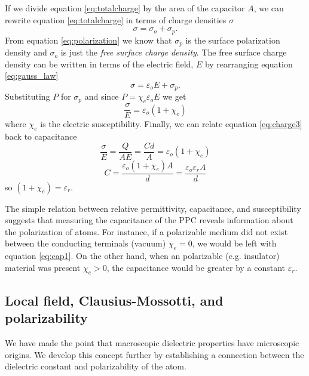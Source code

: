 If we divide equation \ref{eq:totalcharge} by the area of the capacitor $A$, we can rewrite equation \ref{eq:totalcharge} in terms of charge densities $\sigma$
\begin{equation}\label{eq:charged}
\sigma = \sigma_{o}+\sigma_{p}.
\end{equation}
From equation \ref{eq:polarization} we know that $\sigma_{p}$ is the surface polarization density and $\sigma_{o}$ is just the \textit{free surface charge density}. The free surface charge density can be written in terms of the electric field, $E$ by rearranging equation \ref{eq:gauss_law}
\begin{equation}\label{eq:charge2}
\sigma = \varepsilon_{o}E + \sigma_{p}.
\end{equation}
Substituting $P$ for $\sigma_{p}$ and since $P = \chi_{e}\varepsilon_{o}E$ we get 
\begin{equation}\label{eq:charge3}
\frac{\sigma}{E } = \varepsilon_{o}(1+\chi_{e})
\end{equation}
where $\chi_{e}$ is the electric susceptibility. Finally, we can relate equation \ref{eq:charge3} back to capacitance 
\begin{equation}\label{eq:charge4}
\frac{\sigma}{E } = \frac{Q}{AE} = \frac{Cd}{A} = \varepsilon_{o}(1+\chi_{e})
\end{equation}
\begin{equation}\label{eq:charge5}
C = \frac{\varepsilon_{o}(1+\chi_{e})A}{d} =  \frac{\varepsilon_{o} \varepsilon_{r} A}{d} 
\end{equation}
so $(1+\chi_{e})= \varepsilon_{r}$.

The simple relation between relative permittivity, capacitance, and susceptibility suggests that measuring the capacitance of the PPC reveals information about the polarization of atoms. For instance, if a polarizable medium did not exist between the conducting terminals (vacuum) $\chi_{e} =  0$, we would be left with equation \ref{eq:cap1}. On the other hand, when an polarizable (e.g. insulator) material was present $\chi_{e} > 0$, the capacitance would be greater by a constant $\varepsilon_{r}$.

\subsection{Local field, Clausius-Mossotti, and polarizability}

We have made the point that macroscopic dielectric properties have microscopic origins. We develop this concept further by establishing a connection between the dielectric constant and polarizability of the atom. 

